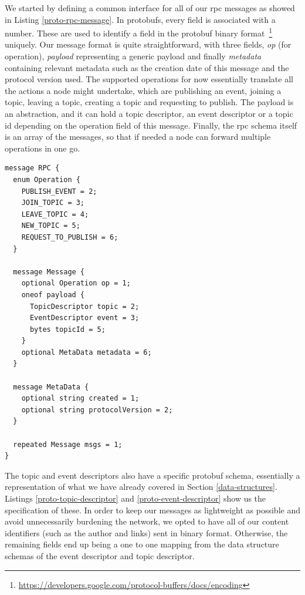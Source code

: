 We started by defining a common interface for all of our \acrshort{rpc}
messages as showed in Listing \ref{proto-rpc-message}. In protobufs, every
field is associated with a number. These are used to identify a field in the
protobuf binary
format~\footnote{\url{https://developers.google.com/protocol-buffers/docs/encoding}}
uniquely.  Our message format is quite straightforward, with three fields,
\emph{op} (for operation), \emph{payload} representing a generic payload and
finally \emph{metadata} containing relevant metadata such as the creation date
of this message and the protocol version used. The supported operations for now
essentially translate all the actions a node might undertake, which are
publishing an event, joining a topic, leaving a topic, creating a topic and
requesting to publish. The payload is an abstraction, and it can hold a topic
descriptor, an event descriptor or a topic \acrshort{id} depending on the
operation field of this message. Finally, the \acrshort{rpc} schema itself is
an array of the messages, so that if needed a node can forward multiple
operations in one go.

\begin{lstlisting}[float, language=protobuf3,caption={Protobuf schema for our
\acrshort{rpc} messages},label={proto-rpc-message}]
message RPC {
  enum Operation {
    PUBLISH_EVENT = 2;
    JOIN_TOPIC = 3;
    LEAVE_TOPIC = 4;
    NEW_TOPIC = 5;
    REQUEST_TO_PUBLISH = 6;
  }

  message Message {
    optional Operation op = 1;
    oneof payload {
      TopicDescriptor topic = 2;
      EventDescriptor event = 3;
      bytes topicId = 5;
    }
    optional MetaData metadata = 6;
  }

  message MetaData {
    optional string created = 1;
    optional string protocolVersion = 2;
  }

  repeated Message msgs = 1;
}
\end{lstlisting}

The topic and event descriptors also have a specific protobuf schema,
essentially a representation of what we have already covered in Section
\ref{data-structures}. Listings \ref{proto-topic-descriptor} and
\ref{proto-event-descriptor} show us the specification of these. In order to
keep our messages as lightweight as possible and avoid unnecessarily burdening
the network, we opted to have all of our content identifiers (such as the
author and links) sent in binary format. Otherwise, the remaining fields end up
being a one to one mapping from the data structure schemas of the event
descriptor and topic descriptor.

